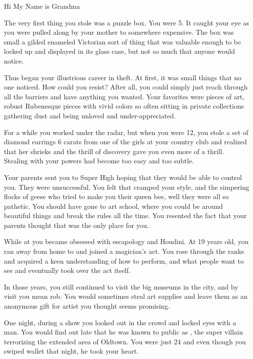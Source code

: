 \documentclass[char]{LRSguildcamp1}
\begin{document}
\name{\cGrandma{}}
Hi My Name is Grandma

The very first thing you stole was a puzzle box. You were 5. It caught your eye as you were pulled along by your mother to somewhere expensive. The box was small a gilded enameled Victorian sort of thing that was valuable enough to be locked up and displayed in its glass case, but not so much that anyone would notice. 

Thus began your illustrious career in theft. At first, it was small things that no one noticed. How could you resist? After all, you could simply just reach through all the barriers and have anything you wanted. Your favorites were pieces of art, robust Rubenesque pieces with vivid colors so often sitting in private collections gathering dust and being unloved and under-appreciated. 

For a while you worked under the radar,  but when you were 12, you stole a set of diamond earrings 6 carats from one of the girls at your country club and realized that her shrieks and the thrill of discovery gave you even more of a thrill. Stealing with your powers had become too easy and too subtle. 

Your parents sent you to Super High hoping that they would be able to control you. They were unsuccessful. You felt that \pSuperSchool{} cramped your style, and the simpering flocks of geese who tried to make you their queen bee, well they were all so pathetic. You should have gone to art school, where you could be around beautiful things and break the rules all the time. You resented the fact that your parents thought that \pSuperSchool{} was the only place for you. 

While at \pSuperSchool{} you became obsessed with escapology and Houdini. At 19 years old, you ran away from home to \pCityGrandma{} and joined a magician’s act. You rose through the ranks and acquired a keen understanding of how to perform, and what people want to see and eventually took over the act itself.  

In those years, you still continued to visit the big museums in the city, and by visit you mean rob. You would sometimes steal art supplies and leave them as an anonymous gift for artist you thought seems promising. 

One night, during a show you looked out in the crowd and locked eyes with a man. You would find out late that he was known to public as \cGS{}, the super villain terrorizing the extended area of Oldtown. You were just 24 and even though you swiped \cGS{\their} wallet that night, he took your heart.
\end{document}
